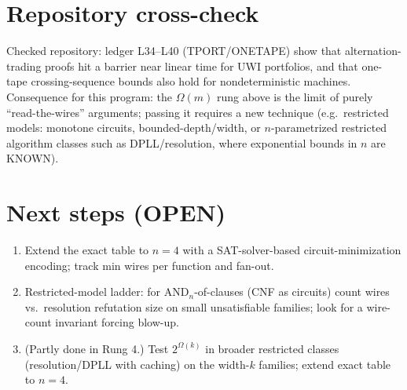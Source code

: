 \documentclass[11pt]{article}
\theoremstyle{remark}\newtheorem{remark}[theorem]{Remark}
\begin{document}
\section{Repository cross-check}
Checked repository: ledger L34--L40 (TPORT/ONETAPE) show that alternation-trading proofs hit a barrier near linear time for UWI portfolios, and that one-tape crossing-sequence bounds also hold for nondeterministic machines. Consequence for this program: the $\Omega(m)$ rung above is the limit of purely ``read-the-wires'' arguments; passing it requires a new technique (e.g.\ restricted models: monotone circuits, bounded-depth/width, or $n$-parametrized restricted algorithm classes such as DPLL/resolution, where exponential bounds in $n$ are KNOWN).

\section{Next steps (OPEN)}
\begin{enumerate}
\item Extend the exact table to $n=4$ with a SAT-solver-based circuit-minimization encoding; track min wires per function and fan-out.
\item Restricted-model ladder: for $\mathrm{AND}_n$-of-clauses (CNF as circuits) count wires vs.\ resolution refutation size on small unsatisfiable families; look for a wire-count invariant forcing blow-up.
\item (Partly done in Rung 4.) Test $2^{\Omega(k)}$ in broader restricted classes (resolution/DPLL with caching) on the width-$k$ families; extend exact table to $n=4$.
\end{enumerate}
\end{document}
